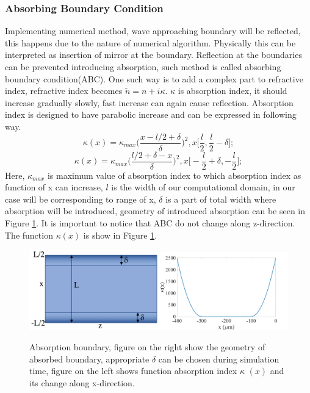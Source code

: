\documentclass{article}
\begin{document}
	\subsubsection{Absorbing Boundary Condition}
	Implementing numerical method, wave approaching boundary will be reflected, this happens due to the nature of numerical algorithm. Physically this can be interpreted as insertion of mirror at the boundary. Reflection at the boundaries can be prevented introducing absorption, such method is called absorbing boundary condition(ABC). One such way is to add a complex part to refractive index, refractive index becomes $\tilde{n} = n+i\kappa$. $\kappa$  is absorption index, it should increase gradually slowly, fast increase can again cause reflection. Absorption index is designed to have parabolic increase and can be expressed in following way.
	\[\kappa(x)=\kappa_{max}\bigg(\frac{x-l/2+\delta}{\delta}\bigg)^2, x\bigg[\frac{l}{2},\frac{l}{2}-\delta\bigg];\]
	\[\kappa(x)=\kappa_{max}\bigg(\frac{l/2+\delta-x}{\delta}\bigg)^2, x\bigg[-\frac{l}{2}+\delta,-\frac{l}{2}\bigg];\]
	Here, $\kappa_{max}$ is maximum value of absorption index to which absorption index as function of x can increase, $l$ is the width of our computational domain, in our case will be corresponding to range of x, $\delta$ is a part of total width where absorption will be introduced, geometry of introduced absorption can be seen in Figure \ref{fig:Absorption}. It is important to notice that ABC do not change along z-direction. The function $\kappa (x)$ is show in Figure \ref{fig:Absorption}.
	\begin{figure}[h!]
		\centering 
		\includegraphics[width=0.5\textwidth]{sketchN1.png}\includegraphics[width=0.5\textwidth]{N2.jpg}
		\caption{\label{fig:Absorption}Absorption boundary, figure on the right show the geometry of absorbed boundary, appropriate $\delta$ can be chosen during simulation time, figure on the left shows function absorption index $\kappa$ $ (x) $ and its change along x-direction.}
	\end{figure}
\end{document}
